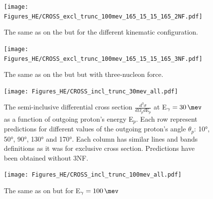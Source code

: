         \begin{figure}[h]
            \begin{center}
                \texttt{[image: Figures\_HE/CROSS\_excl\_trunc\_100mev\_165\_15\_15\_165\_2NF.pdf]}
                \end{center}
                \caption{The same as on the  but for the different kinematic
                configuration.}
                \label{CROSS_HE_EXCL_165_15_15_165}
        \end{figure}

        \begin{figure}[h]
            \begin{center}
                \texttt{[image: Figures\_HE/CROSS\_excl\_trunc\_100mev\_165\_15\_15\_165\_3NF.pdf]}
                \end{center}
                \caption{The same as on the  but but with three-nucleon force.}
                \label{CROSS_HE_EXCL_165_15_15_165_3NF}
        \end{figure}



        \begin{figure}[h]
            \begin{center}
            \texttt{[image: Figures\_HE/CROSS\_incl\_trunc\_30mev\_all.pdf]}
            \end{center}
            \caption{The semi-inclusive differential cross section $\frac{d^3\sigma}{d\Omega_p d\text{E}_p}$
            at E$_\gamma = \SI{30}{\mev}$ as a function of outgoing proton's energy E$_p$. Each row represent 
            predictions for different values of the outgoing proton's angle $\theta_p$: 
            \ang{10}, \ang{50}, \ang{90}, \ang{130} and \ang{170}. Each column has similar 
            lines and bands definitions as it was for exclusive cross section.  
            Predictions have been obtained without 3NF.}
            \label{CROSS_HE_INCL_30MEV_2NF}
        \end{figure}

        \begin{figure}[h]
            \begin{center}
            \texttt{[image: Figures\_HE/CROSS\_incl\_trunc\_100mev\_all.pdf]}
            \end{center}
            \caption{The same as on  but for E$_\gamma = \SI{100}{\mev}$}
            \label{CROSS_HE_INCL_100MEV_2NF}
        \end{figure}


